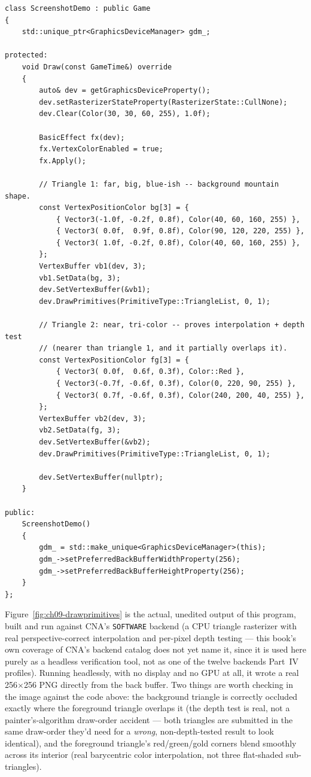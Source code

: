 \begin{lstlisting}
class ScreenshotDemo : public Game
{
    std::unique_ptr<GraphicsDeviceManager> gdm_;

protected:
    void Draw(const GameTime&) override
    {
        auto& dev = getGraphicsDeviceProperty();
        dev.setRasterizerStateProperty(RasterizerState::CullNone);
        dev.Clear(Color(30, 30, 60, 255), 1.0f);

        BasicEffect fx(dev);
        fx.VertexColorEnabled = true;
        fx.Apply();

        // Triangle 1: far, big, blue-ish -- background mountain shape.
        const VertexPositionColor bg[3] = {
            { Vector3(-1.0f, -0.2f, 0.8f), Color(40, 60, 160, 255) },
            { Vector3( 0.0f,  0.9f, 0.8f), Color(90, 120, 220, 255) },
            { Vector3( 1.0f, -0.2f, 0.8f), Color(40, 60, 160, 255) },
        };
        VertexBuffer vb1(dev, 3);
        vb1.SetData(bg, 3);
        dev.SetVertexBuffer(&vb1);
        dev.DrawPrimitives(PrimitiveType::TriangleList, 0, 1);

        // Triangle 2: near, tri-color -- proves interpolation + depth test
        // (nearer than triangle 1, and it partially overlaps it).
        const VertexPositionColor fg[3] = {
            { Vector3( 0.0f,  0.6f, 0.3f), Color::Red },
            { Vector3(-0.7f, -0.6f, 0.3f), Color(0, 220, 90, 255) },
            { Vector3( 0.7f, -0.6f, 0.3f), Color(240, 200, 40, 255) },
        };
        VertexBuffer vb2(dev, 3);
        vb2.SetData(fg, 3);
        dev.SetVertexBuffer(&vb2);
        dev.DrawPrimitives(PrimitiveType::TriangleList, 0, 1);

        dev.SetVertexBuffer(nullptr);
    }

public:
    ScreenshotDemo()
    {
        gdm_ = std::make_unique<GraphicsDeviceManager>(this);
        gdm_->setPreferredBackBufferWidthProperty(256);
        gdm_->setPreferredBackBufferHeightProperty(256);
    }
};
\end{lstlisting}

Figure~\ref{fig:ch09-drawprimitives} is the actual, unedited output of this program, built and
run against CNA's \texttt{SOFTWARE} backend (a CPU triangle rasterizer with real
perspective-correct interpolation and per-pixel depth testing --- this book's own coverage of
CNA's backend catalog does not yet name it, since it is used here purely as a headless
verification tool, not as one of the twelve backends Part~IV profiles). Running headlessly, with
no display and no GPU at all, it wrote a real 256$\times$256 PNG directly from the back buffer.
Two things are worth checking in the image against the code above: the background triangle is
correctly occluded exactly where the foreground triangle overlaps it (the depth test is real,
not a painter's-algorithm draw-order accident --- both triangles are submitted in the same
draw-order they'd need for a \emph{wrong}, non-depth-tested result to look identical), and the
foreground triangle's red/green/gold corners blend smoothly across its interior (real
barycentric color interpolation, not three flat-shaded sub-triangles).

